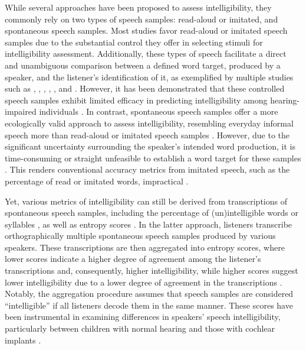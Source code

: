 \documentclass[
  authoryear,
  preprint,
  1p]{elsarticle}
\begin{document}
While several approaches have been proposed to assess intelligibility,
they commonly rely on two types of speech samples: read-aloud or
imitated, and spontaneous speech samples. Most studies favor read-aloud
or imitated speech samples due to the substantial control they offer in
selecting stimuli for intelligibility assessment. Additionally, these
types of speech facilitate a direct and unambiguous comparison between a
defined word target, produced by a speaker, and the listener's
identification of it, as exemplified by multiple studies such as
\citet{Castellanos_et_al_2014}, \citet{Chin_et_al_2012},
\citet{Chin_et_al_2014}, \citet{Freeman_et_al_2017},
\citet{Khwaileh_et_al_2010}, and \citet{Montag_et_al_2014}. However, it
has been demonstrated that these controlled speech samples exhibit
limited efficacy in predicting intelligibility among hearing-impaired
individuals \citep{Cox_et_al_1989, Ertmer_2011}. {In contrast,
spontaneous speech samples offer a more ecologically valid approach to
assess intelligibility, resembling everyday informal speech more than
read-aloud or imitated speech samples \citep{Boonen_et_al_2021}.
However, due to the significant uncertainty surrounding the speaker's
intended word production, it is time-consuming or straight unfeasible to
establish a word target for these samples
\citep{Flipsen_2006, Lagerberg_et_al_2014}. This renders conventional
accuracy metrics from imitated speech, such as the percentage of read or
imitated words, impractical \citep{Boonen_et_al_2021}.}

{Yet, various metrics of intelligibility can still be derived from
transcriptions of spontaneous speech samples, including the percentage
of (un)intelligible words or syllables
\citep{Flipsen_2006, Lagerberg_et_al_2014}, as well as entropy scores
\citep{Boonen_et_al_2021}. In the latter approach,} listeners transcribe
orthographically multiple spontaneous speech samples produced by various
speakers. These transcriptions are then aggregated into entropy scores,
where lower scores indicate a higher degree of agreement among the
listener's transcriptions and, consequently, higher intelligibility,
while higher scores suggest lower intelligibility due to a lower degree
of agreement in the transcriptions
\citep{Boonen_et_al_2021, Faes_et_al_2022}. Notably, the aggregation
procedure assumes that speech samples are considered ``intelligible'' if
all listeners decode them in the same manner. These scores have been
instrumental in examining differences in speakers' speech
intelligibility, particularly between children with normal hearing and
those with cochlear implants \citep{Boonen_et_al_2021}.
\end{document}
